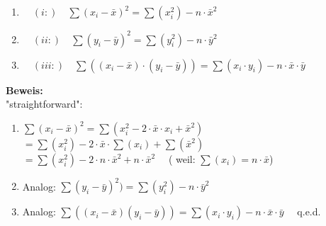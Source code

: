 \documentclass[12pt]{article}
\begin{document}
\begin{enumerate}
 \item  $ \quad (i:) \quad \sum(x_i - \bar{x})^2 = \sum(x_i^2) - n \cdot \bar{x}^2 $\\[0.2cm] 
    
 \item  \( \quad (ii:) \quad \sum(y_i - \bar{y})^2 = \sum(y_i^2) - n \cdot \bar{y}^2\)\\[0.2cm] 
    
 \item  \( \quad (iii:) \quad \sum((x_i - \bar{x}) \cdot (y_i - \bar{y})) = \sum(x_i \cdot y_i) - n \cdot \bar{x} \cdot \bar{y} \)\\[0.2cm] 
\end{enumerate}

\textbf{Beweis:}\\[0.1cm]
"straightforward":

\begin{enumerate}
    \item \( \sum(x_i - \bar{x})^2 = \sum(x_i^2 - 2 \cdot \bar{x} \cdot x_i + \bar{x}^2) \) \\[0.2cm]
        \(= \sum(x_i^2) - 2 \cdot \bar{x} \cdot \sum(x_i) + \sum(\bar{x}^2)\)\\[0.2cm]
        \(= \sum(x_i^2) - 2 \cdot n \cdot \bar{x}^2 + n \cdot \bar{x}^2 \quad \) ( weil:  \(\sum(x_i) = n \cdot \bar{x} \))\\[0.2cm]
        
    \item Analog: \(\sum(y_i - \bar{y})^2) = \sum(y_i^2) - n \cdot \bar{y}^2\)\\[0.2cm]
    
    \item Analog: \( \sum((x_i - \bar{x})(y_i - \bar{y})) = \sum(x_i \cdot y_i) - n \cdot \bar{x} \cdot \bar{y} \quad \)   q.e.d. \\[0.3cm]
\end{enumerate}   
%     
\end{document}
